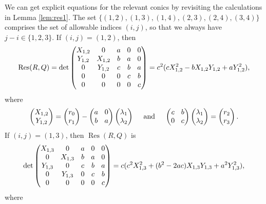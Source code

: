 \documentclass[JEP,XML,SOM,Unicode]{cedram}
\DeclareMathOperator{\Res}{Res}
\begin{document}
We can get explicit equations for the relevant conics by revisiting the calculations in
Lemma \ref{lem:res1}.
The set
$\{(1,2),(1,3),(1,4),(2,3),(2,4),(3,4)\}$ comprises the set of allowable indices $(i,j)$,
so that we always have $j-i\in\{1,2,3\}$.
If $(i,j)=(1,2)$, then
\[\arraycolsep4.5pt
\Res(R,Q)=
\det\begin{pmatrix}
X_{1,2} & 0 & a& 0& 0 \\
Y_{1,2} & X_{1,2}& b& a& 0 \\
0 & Y_{1,2}& c& b& a \\
0 & 0& 0& c& b \\
0 & 0& 0& 0& c
\end{pmatrix}=c^2 (c X_{1,2}^2- b X_{1,2} Y_{1,2} +a Y_{1,2}^2 ),
\]
where
\[\arraycolsep4.5pt
\begin{pmatrix}
X_{1,2}\\
Y_{1,2}\end{pmatrix}
=\begin{pmatrix}
r_0\\
r_1\end{pmatrix}
-\begin{pmatrix}
a & 0 \\
b & a
\end{pmatrix}\begin{pmatrix}
\lambda_1 \\
\lambda_2
\end{pmatrix}\quad\text{ and }\quad\begin{pmatrix}
c & b \\
0 & c
\end{pmatrix}\begin{pmatrix}
\lambda_1 \\
\lambda_2 \\
\end{pmatrix}=\begin{pmatrix}
r_2 \\
r_3
\end{pmatrix}.
\]
If $(i,j)=(1,3)$, then $\Res(R,Q)$ is
\[\arraycolsep4.5pt
\det\begin{pmatrix}
X_{1,3} & 0 & a& 0& 0 \\
0 & X_{1,3}& b& a& 0 \\
Y_{1,3} & 0& c& b& a \\
0 & Y_{1,3}& 0& c& b \\
0 & 0& 0& 0& c \\
\end{pmatrix}=c (c^2 X_{1,3}^2+(b^2- 2 a c) X_{1,3} Y_{1,3} +a^2 Y_{1,3}^2),
\]
where
\end{document}
